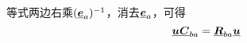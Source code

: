 等式两边右乘$(\underline{\bm{e}}_a)^{-1}$，消去$\underline{\bm{e}}_a$，可得
\begin{equation}
	\underline{\bm{u}} \underline{\bm{C}}_{ba} = \underline{\bm{R}}_{ba} \underline{\bm{u}}
\end{equation}






















